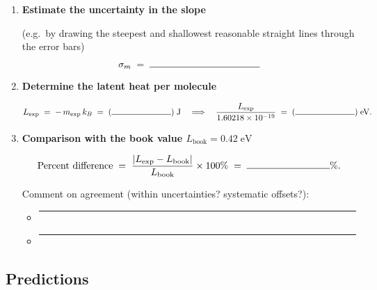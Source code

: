 \documentclass[12pt]{article}
\theoremstyle{definition} %
\theoremstyle{plain} %
\begin{document}
\begin{enumerate}
  \item \textbf{Estimate the uncertainty in the slope}
  
  (e.g.\ by drawing the steepest and shallowest reasonable straight lines
  through the error bars)
  
  \[
    \sigma_{m}
    \;=\;
    \rule{4cm}{0.15mm}
  \]
  
  \item \textbf{Determine the latent heat per molecule}
  
  \[
    L_{\text{exp}}
    \;=\;
    -\,m_{\text{exp}}\,k_B
    \;=\;
    (\rule{2.5cm}{0.15mm})\;\text{J}
    \quad\Longrightarrow\quad
    \frac{L_{\text{exp}}}{1.60218\times10^{-19}}
    \;=\;
    (\rule{2.5cm}{0.15mm})\;\text{eV}.
  \]
  
  \item \textbf{Comparison with the book value \(L_{\text{book}} = 0.42\;\text{eV}\)}
  
  \[
    \text{Percent difference}
    \;=\;
    \frac{\lvert L_{\text{exp}}-L_{\text{book}}\rvert}
         {L_{\text{book}}}\times100\%
    \;=\;
    \rule{3cm}{0.15mm}\%.
  \]
  
  \vspace*{0.5em}
  Comment on agreement (within uncertainties? systematic offsets?):
  \begin{itemize}
    \item[] \rule{0.93\linewidth}{0.4pt}
    \item[] \rule{0.93\linewidth}{0.4pt}
  \end{itemize}
  
  \end{enumerate}
  \subsection*{Predictions}
\end{document}
